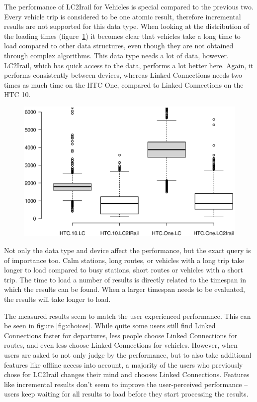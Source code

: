 \documentclass[twocolumn]{phdsymp} %
\begin{document}
The performance of LC2Irail for Vehicles is special compared to the previous two. Every vehicle trip is considered to be one atomic result, therefore incremental results are not supported for this data type. When looking at the distribution of the loading times (figure~\ref{fig:vehicle}) it becomes clear that vehicles take a long time to load compared to other data structures, even though they are not obtained through complex algorithms. This data type needs a lot of data, however. LC2Irail, which has quick access to the data, performs a lot better here. Again, it performs consistently between devices, whereas Linked Connections needs two times as much time on the HTC One, compared to Linked Connections on the HTC 10.

\begin{figure}[ht]
	\begin{center}
		\includegraphics[trim=3cm 4cm 0 0, width=.50\textwidth]{images/boxplot_vehicles.eps}
		\caption{\label{fig:vehicle} }
	\end{center}
\end{figure}

Not only the data type and device affect the performance, but the exact query is of importance too. Calm stations, long routes, or vehicles with a long trip take longer to load compared to busy stations, short routes or vehicles with a short trip. The time to load a number of results is directly related to the timespan in which the results can be
found. When a larger timespan needs to be evaluated, the results will take longer to load.

The measured results seem to match the user experienced performance. This can be seen in figure \ref{fig:choices}. While quite some users still find Linked Connections faster for departures, less people choose Linked Connections for routes, and even less choose Linked Connections for vehicles. However, when users are asked to not only judge by the performance, but to also take additional features like offline access into account, a majority of the users who previously chose for LC2Irail changes their mind and chooses Linked Connections. Features like incremental results don’t seem to improve the user-perceived performance – users keep waiting for all results to load before they start processing the results.
\end{document}
